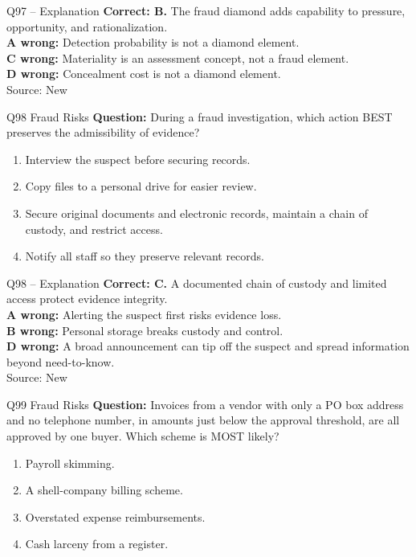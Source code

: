 \documentclass[aspectratio=169,10pt]{beamer}
\begin{document}
\begin{frame}[t]{Q97 -- Explanation}
	\footnotesize
	\textbf{Correct: B.} The fraud diamond adds capability to pressure, opportunity, and rationalization. \\[5pt]
\textbf{A wrong:} Detection probability is not a diamond element. \\[3pt]
\textbf{C wrong:} Materiality is an assessment concept, not a fraud element. \\[3pt]
\textbf{D wrong:} Concealment cost is not a diamond element. \\[3pt]
	\vfill {\tiny Source: New}
\end{frame}

\begin{frame}[t]{Q98 \hfill {\scriptsize Fraud Risks}}
	\small
	\textbf{Question:} During a fraud investigation, which action BEST preserves the admissibility of evidence?
	\begin{enumerate}[label=\Alph*.,itemsep=1pt,topsep=3pt]
			\item Interview the suspect before securing records.
			\item Copy files to a personal drive for easier review.
			\item Secure original documents and electronic records, maintain a chain of custody, and restrict access.
			\item Notify all staff so they preserve relevant records.
	\end{enumerate}
\end{frame}

\begin{frame}[t]{Q98 -- Explanation}
	\footnotesize
	\textbf{Correct: C.} A documented chain of custody and limited access protect evidence integrity. \\[5pt]
\textbf{A wrong:} Alerting the suspect first risks evidence loss. \\[3pt]
\textbf{B wrong:} Personal storage breaks custody and control. \\[3pt]
\textbf{D wrong:} A broad announcement can tip off the suspect and spread information beyond need-to-know. \\[3pt]
	\vfill {\tiny Source: New}
\end{frame}

\begin{frame}[t]{Q99 \hfill {\scriptsize Fraud Risks}}
	\small
	\textbf{Question:} Invoices from a vendor with only a PO box address and no telephone number, in amounts just below the approval threshold, are all approved by one buyer. Which scheme is MOST likely?
	\begin{enumerate}[label=\Alph*.,itemsep=1pt,topsep=3pt]
			\item Payroll skimming.
			\item A shell-company billing scheme.
			\item Overstated expense reimbursements.
			\item Cash larceny from a register.
	\end{enumerate}
\end{frame}
\end{document}
